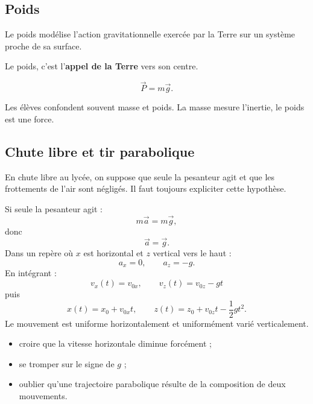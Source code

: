 \documentclass[11pt,a4paper]{article}
\begin{document}
\subsection{Poids}

\begin{sens}
Le poids modélise l'action gravitationnelle exercée par la Terre sur un système proche de sa surface.
\end{sens}

\begin{imagem}
Le poids, c'est l'\textbf{appel de la Terre} vers son centre.
\end{imagem}

\begin{bilan}
\[
\vec P = m\vec g.
\]
\end{bilan}

\begin{fausseintuition}
Les élèves confondent souvent masse et poids.
La masse mesure l'inertie, le poids est une force.
\end{fausseintuition}

\subsection{Chute libre et tir parabolique}

\begin{modele}
En chute libre au lycée, on suppose que seule la pesanteur agit et que les frottements de l'air sont négligés.
Il faut toujours expliciter cette hypothèse.
\end{modele}

\begin{demo}
Si seule la pesanteur agit :
\[
m\vec a = m\vec g,
\]
donc
\[
\vec a = \vec g.
\]
Dans un repère où \(x\) est horizontal et \(z\) vertical vers le haut :
\[
a_x=0,\qquad a_z=-g.
\]
En intégrant :
\[
v_x(t)=v_{0x},\qquad v_z(t)=v_{0z}-gt
\]
puis
\[
x(t)=x_0+v_{0x}t,\qquad z(t)=z_0+v_{0z}t-\frac12gt^2.
\]
Le mouvement est uniforme horizontalement et uniformément varié verticalement.
\end{demo}

\begin{erreurs}
\begin{itemize}
    \item croire que la vitesse horizontale diminue forcément ;
    \item se tromper sur le signe de \(g\) ;
    \item oublier qu'une trajectoire parabolique résulte de la composition de deux mouvements.
\end{itemize}
\end{erreurs}
\end{document}
